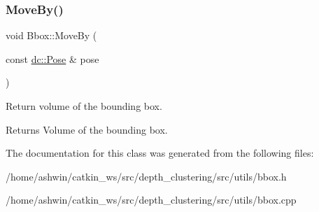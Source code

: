 \subsubsection{\texorpdfstring{Move\+By()}{MoveBy()}}
{\footnotesize\ttfamily void Bbox\+::\+Move\+By (\begin{DoxyParamCaption}\item[{const \hyperlink{classdepth__clustering_1_1Pose}{dc\+::\+Pose} \&}]{pose }\end{DoxyParamCaption})\hspace{0.3cm}{\ttfamily [inline]}}



Return volume of the bounding box. 

\begin{DoxyReturn}{Returns}
Volume of the bounding box. 
\end{DoxyReturn}


The documentation for this class was generated from the following files\+:\begin{DoxyCompactItemize}
\item 
/home/ashwin/catkin\+\_\+ws/src/depth\+\_\+clustering/src/utils/bbox.\+h\item 
/home/ashwin/catkin\+\_\+ws/src/depth\+\_\+clustering/src/utils/bbox.\+cpp\end{DoxyCompactItemize}
